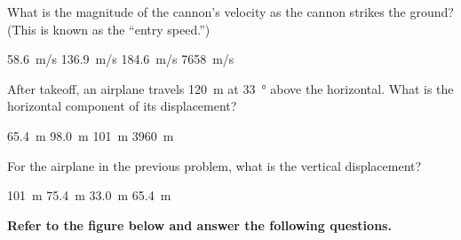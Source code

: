 \documentclass[../main-physics-workbook.tex]{subfiles}
\begin{document}
\begin{questions}
\question
What is the magnitude of the cannon's velocity as the cannon strikes the ground? (This is known as the ``entry speed.'')

\begin{choices}
    \choice \SI{58.6}{m/s}
    \correctchoice \SI{136.9}{m/s}
    \choice \SI{184.6}{m/s}
    \choice \SI{7658}{m/s}
\end{choices}




\clearpage
\question
After takeoff, an airplane travels \SI{120}{m} at \SI{33}{\degree} above the horizontal. What is the horizontal component of its displacement?

\begin{choices}
    \choice \SI{65.4}{m}
    \choice \SI{98.0}{m}
    \correctchoice \SI{101}{m}
    \choice \SI{3960}{m}
\end{choices}

\question
For the airplane in the previous problem, what is the vertical displacement?

\begin{choices}
    \choice \SI{101}{m}
    \choice \SI{75.4}{m}
    \choice \SI{33.0}{m}
    \correctchoice \SI{65.4}{m}
\end{choices}


\begin{EnvUplevel}
\textbf{Refer to the figure below and answer the following questions.}
\end{EnvUplevel}

\begin{figure}[h!]
    \centering
\def\A{5}
\def\angle{142}
\end{figure}


\end{questions}
\end{document}
